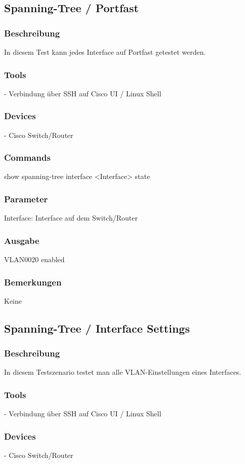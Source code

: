 \documentclass[a4,12pt]{scrartcl}
\begin{document}
\subsection{Spanning-Tree / Portfast}
\subsubsection{Beschreibung}
In diesem Test kann jedes Interface auf Portfast getestet werden.
\subsubsection{Tools}
- Verbindung über SSH auf Cisco UI / Linux Shell
\subsubsection{Devices}
- Cisco Switch/Router
\subsubsection{Commands}
show spanning-tree interface <Interface> state
\subsubsection{Parameter}
Interface: Interface auf dem Switch/Router
\subsubsection{Ausgabe}
VLAN0020            enabled
\subsubsection{Bemerkungen}
Keine


\subsection{Spanning-Tree / Interface Settings}
\subsubsection{Beschreibung}
In diesem Testszenario testet man alle VLAN-Einstellungen eines Interfaces.
\subsubsection{Tools}
- Verbindung über SSH auf Cisco UI / Linux Shell
\subsubsection{Devices}
- Cisco Switch/Router
\end{document}
